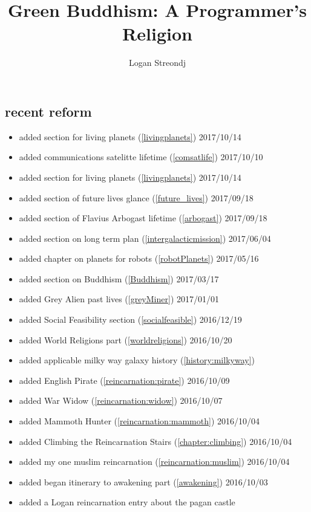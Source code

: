 \documentclass[10pt]{report}
\title{Green Buddhism: A Programmer's Religion}
\author{Logan Streondj \\
  \doclicenseName}
\begin{document}
\begin{titlepage}
\maketitle

\section{recent reform}
\begin{itemize}
  \item added section for living planets (\ref{livingplanets}) 2017/10/14
  \item added communications satelitte lifetime (\ref{comsatlife}) 2017/10/10
  \item added section for living planets (\ref{livingplanets}) 2017/10/14
  \item added section of future lives glance (\ref{future_lives}) 2017/09/18
  \item added section of Flavius Arbogast lifetime (\ref{arbogast}) 2017/09/18
  \item added section on long term plan (\ref{intergalacticmission}) 2017/06/04
  \item added chapter on planets for robots (\ref{robotPlanets}) 2017/05/16
  \item added section on Buddhism (\ref{Buddhism}) 2017/03/17
  \item added Grey Alien past lives (\ref{greyMiner}) 2017/01/01
  \item added Social Feasibility section (\ref{socialfeasible}) 2016/12/19
  \item added World Religions part (\ref{worldreligions}) 2016/10/20
  \item added applicable milky way galaxy history (\ref{history:milkyway})
  \item added English Pirate (\ref{reincarnation:pirate}) 2016/10/09
  \item added War Widow (\ref{reincarnation:widow}) 2016/10/07
  \item added Mammoth Hunter (\ref{reincarnation:mammoth}) 2016/10/04
  \item added Climbing the Reincarnation Stairs (\ref{chapter:climbing})
2016/10/04
  \item added my one muslim reincarnation (\ref{reincarnation:muslim})
2016/10/04
  \item added began itinerary to awakening part (\ref{awakening}) 2016/10/03
  \item added a Logan reincarnation entry about the pagan castle

\end{itemize}
\end{titlepage}
\end{document}
